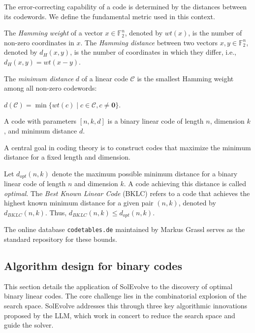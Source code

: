 The error-correcting capability of a code is determined by the distances between its codewords. We define the fundamental metric used in this context.

\begin{definition}
The \textit{Hamming weight} of a vector $x \in \mathbb{F}_2^n$, denoted by $wt(x)$, is the number of non-zero coordinates in $x$. The \textit{Hamming distance} between two vectors $x, y \in \mathbb{F}_2^n$, denoted by $d_H(x, y)$, is the number of coordinates in which they differ, i.e., $d_H(x, y) = wt(x-y)$.
\end{definition}

\begin{definition}
The \textit{minimum distance} $d$ of a linear code $\mathcal{C}$ is the smallest Hamming weight among all non-zero codewords:
\begin{center}
$d(\mathcal{C}) = \min \{ wt(c) \mid c \in \mathcal{C}, c \neq \mathbf{0} \}.$
\end{center}
A code with parameters $[n, k, d]$ is a binary linear code of length $n$, dimension $k$, and minimum distance $d$.
\end{definition}

A central goal in coding theory is to construct codes that maximize the minimum distance for a fixed length and dimension.

\begin{definition}
Let $d_{opt}(n, k)$ denote the maximum possible minimum distance for a binary linear code of length $n$ and dimension $k$. A code achieving this distance is called \textit{optimal}.
The \textit{Best Known Linear Code} (BKLC) refers to a code that achieves the highest known minimum distance for a given pair $(n, k)$, denoted by $d_{BKLC}(n, k)$. Thus, $d_{BKLC}(n, k) \le d_{opt}(n, k)$.
\end{definition}

The online database \texttt{codetables.de} maintained by Markus Grassl \cite{Grassl:codetables} serves as the standard repository for these bounds.

\subsection{Algorithm design for binary codes}
This section details the application of SolEvolve to the discovery of optimal binary linear codes. The core challenge lies in the combinatorial explosion of the search space. SolEvolve addresses this through three key algorithmic innovations proposed by the LLM, which work in concert to reduce the search space and guide the solver.

